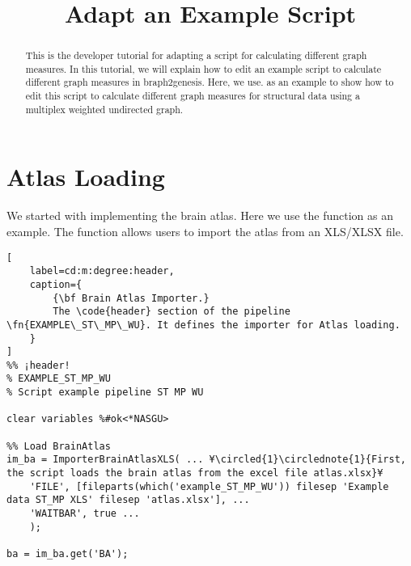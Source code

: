 \documentclass{tufte-handout}
\title{Adapt an Example Script}
\begin{document}
\maketitle

\begin{abstract}
\noindent
This is the developer tutorial for adapting a script for calculating different graph measures. In this tutorial, we will explain how to edit an example script to calculate different graph measures in braph2genesis. Here, we use.  as an example to show how to edit this script to calculate different graph measures for structural data using a multiplex weighted undirected graph.
\end{abstract}

\tableofcontents

\clearpage
\section{Atlas Loading}
We started with implementing the brain atlas. Here we use the function  as an example. The function allows users to import the atlas from an XLS/XLSX file. 
\begin{lstlisting}[
	label=cd:m:degree:header,
	caption={
		{\bf Brain Atlas Importer.}
		The \code{header} section of the pipeline \fn{EXAMPLE\_ST\_MP\_WU}. It defines the importer for Atlas loading.
	}
]
%% ¡header!
% EXAMPLE_ST_MP_WU
% Script example pipeline ST MP WU

clear variables %#ok<*NASGU>

%% Load BrainAtlas
im_ba = ImporterBrainAtlasXLS( ... ¥\circled{1}\circlednote{1}{First, the script loads the brain atlas from the excel file atlas.xlsx}¥
    'FILE', [fileparts(which('example_ST_MP_WU')) filesep 'Example data ST_MP XLS' filesep 'atlas.xlsx'], ...
    'WAITBAR', true ...
    );

ba = im_ba.get('BA');
\end{lstlisting}





\end{document}
